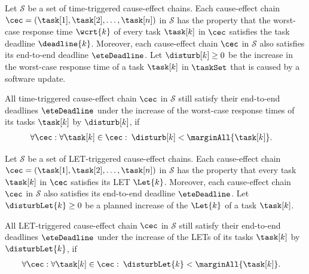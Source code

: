 \begin{tcolorbox}[colback=black!5!white,colframe=black!75!black, breakable, 
title= \textbf{Theorem} (Robustness test for time-triggered cause-effect chains)]
Let $\mathcal{S}$ be a set of time-triggered cause-effect chains. 
Each cause-effect chain $\cec = (\task[1], \task[2], \ldots, \task[n])$ in $\mathcal{S}$ has the property that the worst-case response time $\wcrt{k}$ of every task $\task[k]$ in $\cec$ satisfies the task deadline $\deadline{k}$. 
Moreover, each cause-effect chain $\cec$ in $\mathcal{S}$ also satisfies its end-to-end deadline $\eteDeadline$.
%
Let $\disturb[k] \geq 0$ be the increase in the worst-case response time of a task $\task[k]$ in $\taskSet$ that is caused by a software update.
\smallskip

All time-triggered cause-effect chain $\cec$ in $\mathcal{S}$ still satisfy their end-to-end deadlines $\eteDeadline$ under the increase of the worst-case response times of its tasks $\task[k]$ by $\disturb[k]$, if  
\begin{align*}
	& \forall \cec: \forall \task[k] \in \cec: \:
	\disturb[k] < \marginAll{\task[k]}. 
\end{align*}	
\end{tcolorbox}
\bigskip

\begin{tcolorbox}[colback=black!5!white,colframe=black!75!black, breakable, 
title= \textbf{Theorem} (Robustness test for LET-triggered cause-effect chains)]
Let $\mathcal{S}$ be a set of LET-triggered cause-effect chains. 
Each cause-effect chain $\cec = (\task[1], \task[2], \ldots, \task[n])$ in $\mathcal{S}$ has the property that every task $\task[k]$ in $\cec$ satisfies its LET $\Let{k}$. 
Moreover, each cause-effect chain $\cec$ in $\mathcal{S}$ also satisfies its end-to-end deadline $\eteDeadline$.
%
Let $\disturbLet{k} \geq 0$ be a planned increase of the $\Let{k}$ of a task $\task[k]$.
\smallskip

All LET-triggered cause-effect chain $\cec$ in $\mathcal{S}$ still satisfy their end-to-end deadlines $\eteDeadline$ under the increase of the LETs of its tasks $\task[k]$ by $\disturbLet{k}$, if  
\begin{align*}
	& \forall \cec: \forall \task[k] \in \cec: \:
	\disturbLet{k} < \marginAll{\task[k]}. 
\end{align*}	
\end{tcolorbox}







